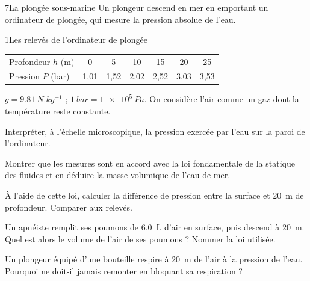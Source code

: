 \begin{exoBac}{7}{La plongée sous-marine}
Un plongeur descend en mer en emportant un ordinateur de plongée, qui mesure la pression absolue de l'eau.
\begin{docu}{1}{Les relevés de l'ordinateur de plongée}
{\centering\small\begin{tabular}{@{}lcccccc@{}}\toprule
Profondeur $h$ (m) & 0 & 5 & 10 & 15 & 20 & 25 \\
Pression $P$ (bar) & 1,01 & 1,52 & 2,02 & 2,52 & 3,03 & 3,53 \\\bottomrule
\end{tabular}\par}
\end{docu}
\begin{donnees}
$g=\qty{9,81}{N.kg^{-1}}$ ; $\qty{1}{bar}=\qty{1e5}{Pa}$. On considère l'air comme un gaz dont la température reste constante.
\end{donnees}
\begin{questions}
\item Interpréter, à l'échelle microscopique, la pression exercée par l'eau sur la paroi de l'ordinateur.
\item Montrer que les mesures sont en accord avec la loi fondamentale de la statique des fluides et en déduire la masse
volumique de l'eau de mer.
\item À l'aide de cette loi, calculer la différence de pression entre la surface et \qty{20}{m} de profondeur. Comparer aux relevés.
\item Un apnéiste remplit ses poumons de \qty{6,0}{L} d'air en surface, puis descend à \qty{20}{m}. Quel est alors le volume de l'air de ses
poumons ? Nommer la loi utilisée.
\item \initiative Un plongeur équipé d'une bouteille respire à \qty{20}{m} de l'air à la pression de l'eau. Pourquoi ne doit-il jamais
remonter en bloquant sa respiration ?
\end{questions}
\end{exoBac}

